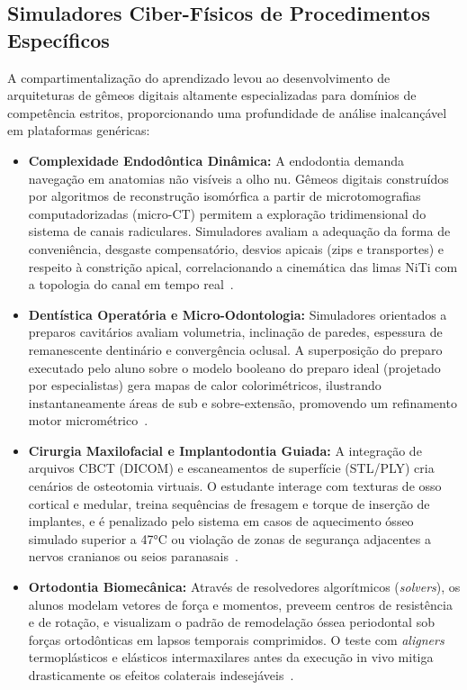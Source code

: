 \subsection{Simuladores Ciber-Físicos de Procedimentos Específicos}
\label{subsec:procedimentos}

A compartimentalização do aprendizado levou ao desenvolvimento de arquiteturas de gêmeos digitais altamente especializadas para domínios de competência estritos, proporcionando uma profundidade de análise inalcançável em plataformas genéricas:

\begin{itemize}
    \item \textbf{Complexidade Endodôntica Dinâmica:} A endodontia demanda navegação em anatomias não visíveis a olho nu. Gêmeos digitais construídos por algoritmos de reconstrução isomórfica a partir de microtomografias computadorizadas (micro-CT) permitem a exploração tridimensional do sistema de canais radiculares. Simuladores avaliam a adequação da forma de conveniência, desgaste compensatório, desvios apicais (zips e transportes) e respeito à constrição apical, correlacionando a cinemática das limas NiTi com a topologia do canal em tempo real~\cite{elsaid2025digital}.
    
    \item \textbf{Dentística Operatória e Micro-Odontologia:} Simuladores orientados a preparos cavitários avaliam volumetria, inclinação de paredes, espessura de remanescente dentinário e convergência oclusal. A superposição do preparo executado pelo aluno sobre o modelo booleano do preparo ideal (projetado por especialistas) gera mapas de calor colorimétricos, ilustrando instantaneamente áreas de sub e sobre-extensão, promovendo um refinamento motor micrométrico~\cite{xing2024clinical}.
    
    \item \textbf{Cirurgia Maxilofacial e Implantodontia Guiada:} A integração de arquivos CBCT (DICOM) e escaneamentos de superfície (STL/PLY) cria cenários de osteotomia virtuais. O estudante interage com texturas de osso cortical e medular, treina sequências de fresagem e torque de inserção de implantes, e é penalizado pelo sistema em casos de aquecimento ósseo simulado superior a 47°C ou violação de zonas de segurança adjacentes a nervos cranianos ou seios paranasais~\cite{menon2026innovations}.
    
    \item \textbf{Ortodontia Biomecânica:} Através de resolvedores algorítmicos (\textit{solvers}), os alunos modelam vetores de força e momentos, preveem centros de resistência e de rotação, e visualizam o padrão de remodelação óssea periodontal sob forças ortodônticas em lapsos temporais comprimidos. O teste com \textit{aligners} termoplásticos e elásticos intermaxilares antes da execução in vivo mitiga drasticamente os efeitos colaterais indesejáveis~\cite{li2024aligner}.
\end{itemize}
